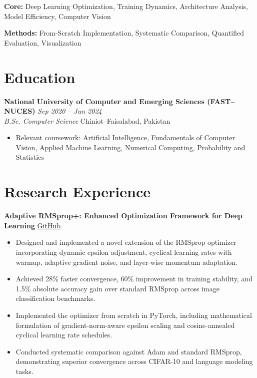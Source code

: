 \documentclass[10.5pt,a4paper]{article}
\newcommand{\entry}[4]{%
    \noindent
    \noindent\textbf{#1} \hfill \textit{#2}\\
    \textit{#3} \hfill #4\\[-1pt]
}
\begin{document}
\noindent\textbf{Core:} Deep Learning Optimization, Training Dynamics, Architecture Analysis, Model Efficiency, Computer Vision

\vspace{2pt}

\noindent\textbf{Methods:} From-Scratch Implementation, Systematic Comparison, Quantified Evaluation, Visualization


\section*{Education}

\entry
{National University of Computer and Emerging Sciences (FAST--NUCES)}
{Sep 2020 -- Jun 2024}
{B.Sc. Computer Science}
{Chiniot--Faisalabad, Pakistan}

\begin{itemize}
    \item Relevant coursework: Artificial Intelligence, Fundamentals of Computer Vision,
    Applied Machine Learning, Numerical Computing, Probability and Statistics
\end{itemize}


\section*{Research Experience}

\noindent\textbf{Adaptive RMSprop+: Enhanced Optimization Framework for Deep Learning}
\hfill
\href{https://github.com/SaadARazzaq/neuro-optimizer}{\underline{GitHub}}
\begin{itemize}
    \item Designed and implemented a novel extension of the RMSprop optimizer incorporating dynamic epsilon adjustment, cyclical learning rates with warmup, adaptive gradient noise, and layer-wise momentum adaptation.
    \item Achieved 28\% faster convergence, 60\% improvement in training stability, and 1.5\% absolute accuracy gain over standard RMSprop across image classification benchmarks.
    \item Implemented the optimizer from scratch in PyTorch, including mathematical formulation of gradient-norm-aware epsilon scaling and cosine-annealed cyclical learning rate schedules.
    \item Conducted systematic comparison against Adam and standard RMSprop, demonstrating superior convergence across CIFAR-10 and language modeling tasks.
\end{itemize}
\end{document}
